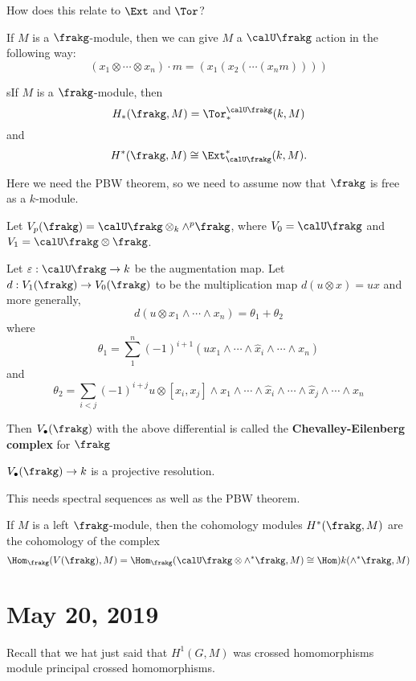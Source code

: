\documentclass[12pt]{article}
\begin{document}
How does this relate to $\Ext$ and $\Tor$?
\begin{rmk}
	If $M$ is a $\frakg$-module, then we can give $M$ a $\calU\frakg$ action in the following way:
	\[(x_1\otimes\cdots\otimes x_n)\cdot m=(x_1(x_2(\cdots(x_nm))))\]
\end{rmk}
\begin{thm}
	sIf $M$ is a $\frakg$-module, then 
	\[H_\ast(\frakg,M)=\Tor_\ast^{\calU\frakg}(k,M)\]
	and 
	\[H^\ast(\frakg,M)\cong\Ext_{\calU\frakg}^\ast(k,M).\]
\end{thm}

Here we need the PBW theorem, so we need to assume now that $\frakg$ is free as a $k$-module.
\begin{defn}
	Let $V_p(\frakg)=\calU\frakg\otimes_k\wedge^p\frakg$, where $V_0=\calU\frakg$ and $V_1=\calU\frakg\otimes\frakg$.
	
	Let $\varepsilon:\calU\frakg\to k$ be the augmentation map. Let $d:V_1(\frakg)\to V_0(\frakg)$
	to be the multiplication map $d(u\otimes x)=ux$ and more generally, 
	\[d(u\otimes x_1\wedge\cdots\wedge x_n)=\theta_1+\theta_2\]
	where
	\[\theta_1=\sum_1^n(-1)^{i+1}(ux_1\wedge\cdots\wedge\hat x_i\wedge\cdots\wedge x_n)\]
	and 
	\[\theta_2=\sum_{i<j}(-1)^{i+j}u\otimes[x_i,x_j]\wedge x_1\wedge\cdots\wedge\hat x_i\wedge\cdots\wedge \hat x_j\wedge\cdots\wedge x_n\]

	Then $V_\bullet(\frakg)$ with the above differential is called the \textbf{Chevalley-Eilenberg complex} for $\frakg$
\end{defn}

\begin{thm}
	$V_\bullet(\frakg)\to k$ is a projective resolution.
\end{thm}
\begin{rmk}
	This needs spectral sequences as well as the PBW theorem.
\end{rmk}
\begin{thm}
	If $M$ is a left $\frakg$-module, then the cohomology modules $H^\ast(\frakg,M)$ are the cohomology of the complex 
	\[\Hom_\frakg(V(\frakg),M)=\Hom_\frakg(\calU\frakg\otimes\wedge^\ast\frakg,M)\cong\Hom)k(\wedge^\ast\frakg,M)\]
\end{thm}

\section{May 20, 2019}
Recall that we hat just said that $H^1(G,M)$ was crossed homomorphisms module principal crossed homomorphisms.
\end{document}

